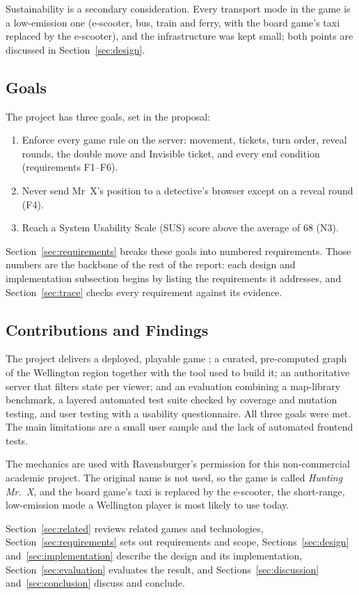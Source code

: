 \documentclass[lettersize,journal]{IEEEtran}
\begin{document}
Sustainability is a secondary consideration. Every transport mode in the game is a low-emission one (e-scooter, bus, train and ferry, with the board game's taxi replaced by the e-scooter), and the infrastructure was kept small; both points are discussed in Section~\ref{sec:design}.

\subsection{Goals}
The project has three goals, set in the proposal:
\begin{enumerate}
	\item Enforce every game rule on the server: movement, tickets, turn order, reveal rounds, the double move and Invisible ticket, and every end condition (requirements F1--F6).
	\item Never send Mr~X's position to a detective's browser except on a reveal round (F4).
	\item Reach a System Usability Scale (SUS) score above the average of 68 (N3).
\end{enumerate}
Section~\ref{sec:requirements} breaks these goals into numbered requirements. Those numbers are the backbone of the rest of the report: each design and implementation subsection begins by listing the requirements it addresses, and Section~\ref{sec:trace} checks every requirement against its evidence.

\subsection{Contributions and Findings}
The project delivers a deployed, playable game \cite{repo}; a curated, pre-computed graph of the Wellington region together with the tool used to build it; an authoritative server that filters state per viewer; and an evaluation combining a map-library benchmark, a layered automated test suite checked by coverage and mutation testing, and user testing with a usability questionnaire. All three goals were met. The main limitations are a small user sample and the lack of automated frontend tests.

The mechanics are used with Ravensburger's permission for this non-commercial academic project. The original name is not used, so the game is called \emph{Hunting Mr.~X}, and the board game's taxi is replaced by the e-scooter, the short-range, low-emission mode a Wellington player is most likely to use today.

Section~\ref{sec:related} reviews related games and technologies, Section~\ref{sec:requirements} sets out requirements and scope, Sections~\ref{sec:design} and~\ref{sec:implementation} describe the design and its implementation, Section~\ref{sec:evaluation} evaluates the result, and Sections~\ref{sec:discussion} and~\ref{sec:conclusion} discuss and conclude.
\end{document}
